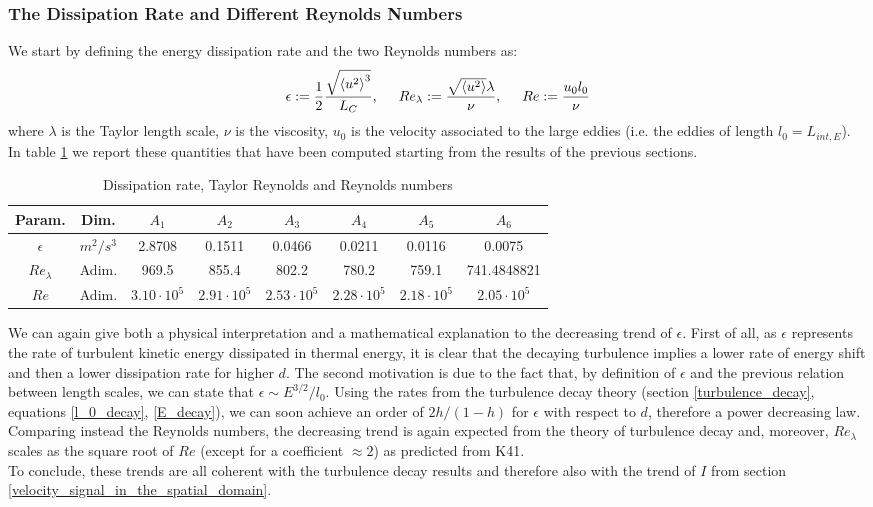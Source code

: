 \documentclass[11pt,titlepage]{article}
\begin{document}
\subsubsection{The Dissipation Rate and Different Reynolds Numbers} \label{the_dissipation_rate_and}
We start by defining the energy dissipation rate and the two Reynolds numbers as:
\begin{equation*}
	\epsilon:=\frac{1}{2} \frac{\sqrt{\left< u^2 \right >^3}}{L_C}, \hspace{5mm} Re_{\lambda} := \frac{\sqrt{\left < u^2\right > } \lambda}{\nu}, \hspace{5mm} Re := \frac{u_0 l_0}{\nu}
\end{equation*}
where $\lambda$ is the Taylor length scale, $\nu$ is the viscosity, $u_0$ is the velocity associated to the large eddies (i.e. the eddies of length $l_0=L_{int,E}$).
In table \ref{tab4} we report these quantities that have been computed starting from the results of the previous sections. \\

\begin{table}[h!]
\centering
\caption{Dissipation rate, Taylor Reynolds and Reynolds numbers} \label{tab4}
    \begin{tabular}{ | c | c | c | c | c | c | c | c |}
        \hline
        Param. & Dim. & $A_1$ & $A_2$ & $A_3$ & $A_4$ & $A_5$ & $A_6$ \\
        \hline
        $\epsilon$ & $m^2/s^3$&2.8708& 0.1511& 0.0466& 0.0211& 0.0116 &0.0075  \\
        \hline
        $Re_\lambda$ & Adim. & 969.5 & 855.4& 802.2 & 780.2& 759.1&
        741.4848821 \\
        \hline
        $Re$& Adim. &$3.10 \cdot 10^5$ & $ 2.91 \cdot 10^5$& $ 2.53 \cdot 10^5$ &$2.28\cdot 10^5$&$ 
        2.18 \cdot 10^5$&$ 2.05\cdot 10^5$ \\
        \hline
    \end{tabular}
\end{table}
We can again give both a physical interpretation and a mathematical explanation to the decreasing trend of $\epsilon$. First of all, as $\epsilon$ represents the rate of turbulent kinetic energy dissipated in thermal energy, it is clear that the decaying turbulence implies a lower rate of energy shift and then a lower dissipation rate for higher $d$. The second motivation is due to the fact that, by definition of $\epsilon$ and the previous relation between length scales, we can state that $\epsilon \sim E^{3/2}/l_0$. Using the rates from the turbulence decay theory (section \ref{turbulence_decay}, equations \ref{l_0_decay}, \ref{E_decay}), we can soon achieve an order of $2h/(1-h)$ for $\epsilon$ with respect to $d$, therefore a power decreasing law. \\
Comparing instead the Reynolds numbers, the decreasing trend is again expected from the theory of turbulence decay and, moreover, $Re_{\lambda}$ scales as the square root of $Re$ (except for a coefficient $\approx 2$) as predicted from K41. \\
To conclude, these trends are all coherent with the turbulence decay results and therefore also with the trend of $I$ from section \ref{velocity_signal_in_the_spatial_domain}.
\end{document}
